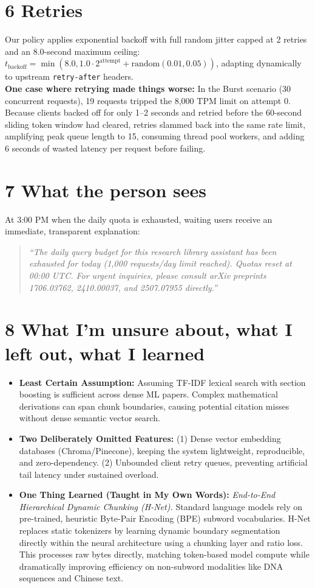 \documentclass[9pt,a4paper]{article}
\begin{document}
\section*{6 Retries}
Our policy applies exponential backoff with full random jitter capped at 2 retries and an 8.0-second maximum ceiling: $t_{\text{backoff}} = \min(8.0, 1.0 \cdot 2^{\text{attempt}} + \text{random}(0.01, 0.05))$, adapting dynamically to upstream \texttt{retry-after} headers.\\
\textbf{One case where retrying made things worse:} In the Burst scenario (30 concurrent requests), 19 requests tripped the 8,000 TPM limit on attempt 0. Because clients backed off for only 1--2 seconds and retried before the 60-second sliding token window had cleared, retries slammed back into the same rate limit, amplifying peak queue length to 15, consuming thread pool workers, and adding 6 seconds of wasted latency per request before failing.

\section*{7 What the person sees}
At 3:00 PM when the daily quota is exhausted, waiting users receive an immediate, transparent explanation:
\begin{quote}
\textit{``The daily query budget for this research library assistant has been exhausted for today (1,000 requests/day limit reached). Quotas reset at 00:00 UTC. For urgent inquiries, please consult arXiv preprints 1706.03762, 2410.00037, and 2507.07955 directly.''}
\end{quote}

\section*{8 What I'm unsure about, what I left out, what I learned}
\begin{itemize}
    \item \textbf{Least Certain Assumption:} Assuming TF-IDF lexical search with section boosting is sufficient across dense ML papers. Complex mathematical derivations can span chunk boundaries, causing potential citation misses without dense semantic vector search.
    \item \textbf{Two Deliberately Omitted Features:} (1) Dense vector embedding databases (Chroma/Pinecone), keeping the system lightweight, reproducible, and zero-dependency. (2) Unbounded client retry queues, preventing artificial tail latency under sustained overload.
    \item \textbf{One Thing Learned (Taught in My Own Words):} \textit{End-to-End Hierarchical Dynamic Chunking (H-Net).} Standard language models rely on pre-trained, heuristic Byte-Pair Encoding (BPE) subword vocabularies. H-Net replaces static tokenizers by learning dynamic boundary segmentation directly within the neural architecture using a chunking layer and ratio loss. This processes raw bytes directly, matching token-based model compute while dramatically improving efficiency on non-subword modalities like DNA sequences and Chinese text.
\end{itemize}
\end{document}
